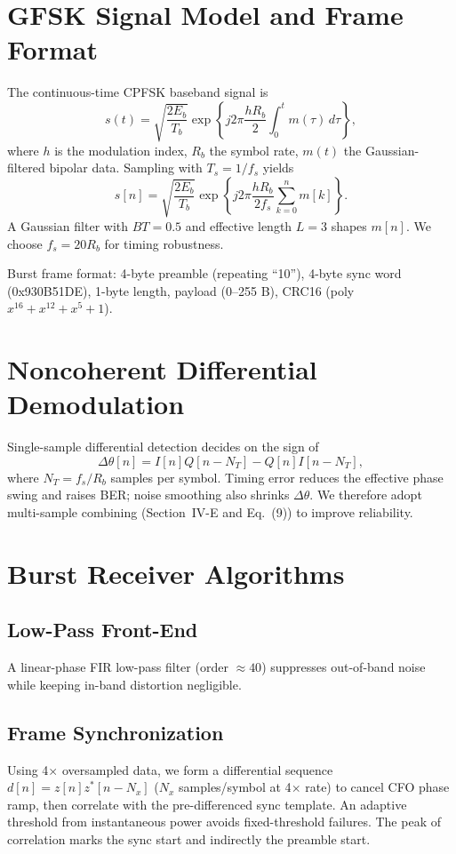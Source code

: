 \documentclass[conference]{IEEEtran}
\begin{document}
\section{GFSK Signal Model and Frame Format}
The continuous-time CPFSK baseband signal is
\begin{equation}
s(t)=\sqrt{\frac{2E_b}{T_b}}\exp\left\{j2\pi \frac{hR_b}{2}\int_{0}^{t} m(\tau)\,d\tau\right\},
\end{equation}
where $h$ is the modulation index, $R_b$ the symbol rate, $m(t)$ the Gaussian-filtered bipolar data. Sampling with $T_s=1/f_s$ yields
\begin{equation}
s[n]=\sqrt{\frac{2E_b}{T_b}}\exp\left\{j2\pi\frac{hR_b}{2f_s}\sum_{k=0}^{n} m[k]\right\}.
\end{equation}
A Gaussian filter with $BT=0.5$ and effective length $L=3$ shapes $m[n]$. We choose $f_s=20R_b$ for timing robustness.

Burst frame format: 4-byte preamble (repeating ``10''), 4-byte sync word (0x930B51DE), 1-byte length, payload (0--255 B), CRC16 (poly $x^{16}+x^{12}+x^{5}+1$).

\section{Noncoherent Differential Demodulation}
Single-sample differential detection decides on the sign of
\begin{equation}
\Delta\theta[n]=I[n]Q[n-N_T]-Q[n]I[n-N_T],
\end{equation}
where $N_T=f_s/R_b$ samples per symbol. Timing error reduces the effective phase swing and raises BER; noise smoothing also shrinks $\Delta\theta$. We therefore adopt multi-sample combining (Section~IV-E and Eq.~(9)) to improve reliability.

\section{Burst Receiver Algorithms}
\subsection{Low-Pass Front-End}
A linear-phase FIR low-pass filter (order $\approx 40$) suppresses out-of-band noise while keeping in-band distortion negligible.

\subsection{Frame Synchronization}
Using 4$\times$ oversampled data, we form a differential sequence $d[n]=z[n]z^{*}[n-N_x]$ ($N_x$ samples/symbol at 4$\times$ rate) to cancel CFO phase ramp, then correlate with the pre-differenced sync template. An adaptive threshold from instantaneous power avoids fixed-threshold failures. The peak of correlation marks the sync start and indirectly the preamble start.
\end{document}
